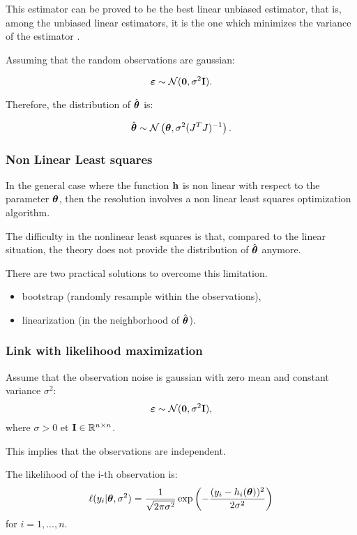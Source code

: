\documentclass[aspectratio=169]{beamer}
\begin{document}

\begin{frame}
This estimator can be proved to be the best linear unbiased estimator, that is, among the unbiased linear estimators, it is the one
which minimizes the variance of the estimator \cite{BinghamFry, Sen1990}.

Assuming that the random observations are gaussian:

$$
\boldsymbol{\varepsilon} \sim \mathcal{N}(\boldsymbol{0},\sigma^2 {\bf I}).
$$

Therefore, the distribution of $\hat{\boldsymbol{\theta}}$ is:

$$
\hat{\boldsymbol{\theta}} \sim \mathcal{N} \left(\boldsymbol{\theta},\sigma^2 (J^T J)^{-1} \right).
$$


\end{frame}


\begin{frame}
\frametitle{Non Linear Least squares}

In the general case where the function ${\bf h}$ is non linear
with respect to the parameter $\boldsymbol{\theta}$, then the resolution involves a non linear least squares optimization algorithm. 

\vspace{20pt}

The difficulty in the nonlinear least squares is that, compared to the
linear situation, the theory does not provide the distribution of
$\hat{\boldsymbol{\theta}}$ anymore.

There are two practical solutions to overcome this limitation.
\begin{itemize}
\item bootstrap (randomly resample within the observations),
\item linearization (in the neighborhood of $\hat{\boldsymbol{\theta}}$).
\end{itemize}

\end{frame}


\begin{frame}
\frametitle{Link with likelihood maximization}
Assume that the observation noise is gaussian with zero mean and constant 
variance $\sigma^2$: 
$$
\boldsymbol{\varepsilon} \sim \mathcal{N}({\bf 0},\sigma^2 {\bf I}),
$$ 
where $\sigma>0$ et ${\bf I}\in\mathbb{R}^{n\times n}$. 

This implies that the observations are independent. 

The likelihood of the i-th observation is:
$$
\ell(y_i|\boldsymbol{\theta},\sigma^2) = 
\frac{1}{\sqrt{2\pi \sigma^2}} 
\exp\left(-\frac{(y_i - h_i(\boldsymbol{\theta}))^2}{2 \sigma^2}\right)
$$
for $i=1,...,n$. 
\end{frame}
\end{document}
